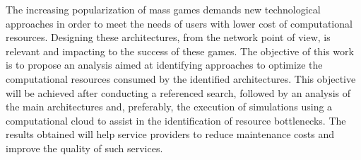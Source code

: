 The increasing popularization of mass games demands new technological approaches in order to meet the needs of users with lower cost of computational resources.
%
Designing these architectures, from the network point of view, is relevant and impacting to the success of these games.
%
The objective of this work is to propose an analysis aimed at identifying approaches to optimize the computational resources consumed by the identified architectures.
%
This objective will be achieved after conducting a referenced search, followed by an analysis of the main architectures and, preferably, the execution of simulations using a computational cloud to assist in the identification of resource bottlenecks. The results obtained will help service providers to reduce maintenance costs and improve the quality of such services.
